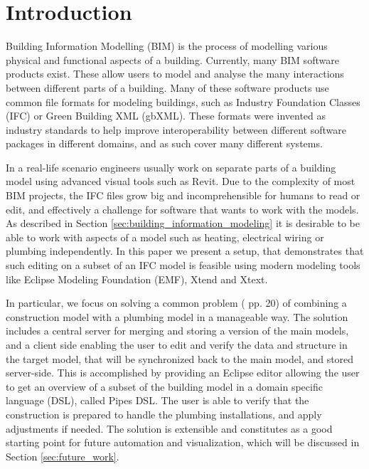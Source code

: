 


\setcounter{page}{1}
\section{Introduction}
Building Information Modelling (BIM) is the process of modelling various physical and functional aspects of a building. Currently, many BIM software products exist. These allow users to model and analyse the many interactions between different parts of a building. Many of these software products use common file formats for modeling buildings, such as Industry Foundation Classes (IFC) or Green Building XML (gbXML). These formats were invented as industry standards to help improve interoperability between different software packages in different domains, and as such cover many different systems.

In a real-life scenario engineers usually work on separate parts of a building model using advanced visual tools such as Revit\cite{revit12}. Due to the complexity of most BIM projects, the IFC files grow big and incomprehensible for humans to read or edit, and effectively a challenge for software that wants to work with the models. As described in Section \ref{sec:building_information_modeling} it is desirable to be able to work with aspects of a model such as heating, electrical wiring or plumbing independently. In this paper we present a setup, that demonstrates that such editing on a subset of an IFC model is feasible using modern modeling tools like Eclipse Modeling Foundation (EMF), Xtend and Xtext.

In particular, we focus on solving a common problem (\cite{jorgensen10} pp. 20) of combining a construction model with a plumbing model in a manageable way. The solution includes a central server for merging and storing a version of the main models, and a client side enabling the user to edit and verify the data and structure in the target model, that will be synchronized back to the main model, and stored server-side. This is accomplished by providing an Eclipse editor allowing the user to get an overview of a subset of the building model in a domain specific language (DSL), called Pipes DSL. The user is able to verify that the construction is prepared to handle the plumbing installations, and apply adjustments if needed. The solution is extensible and constitutes as a good starting point for future automation and visualization, which will be discussed in Section \ref{sec:future_work}.

